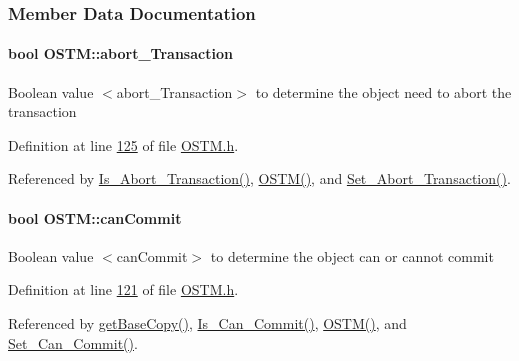 \subsubsection{Member Data Documentation}
\paragraph[{\texorpdfstring{abort\+\_\+\+Transaction}{abort_Transaction}}]{\setlength{\rightskip}{0pt plus 5cm}bool O\+S\+T\+M\+::abort\+\_\+\+Transaction\hspace{0.3cm}{\ttfamily [private]}}\hypertarget{class_o_s_t_m_a5121d9c4b08320b26beca82ba2f85c4a_a5121d9c4b08320b26beca82ba2f85c4a}{}\label{class_o_s_t_m_a5121d9c4b08320b26beca82ba2f85c4a_a5121d9c4b08320b26beca82ba2f85c4a}
Boolean value $<$abort\+\_\+\+Transaction$>$ to determine the object need to abort the transaction 

Definition at line \hyperlink{_o_s_t_m_8h_source_l00125}{125} of file \hyperlink{_o_s_t_m_8h_source}{O\+S\+T\+M.\+h}.



Referenced by \hyperlink{_o_s_t_m_8cpp_source_l00140}{Is\+\_\+\+Abort\+\_\+\+Transaction()}, \hyperlink{_o_s_t_m_8cpp_source_l00021}{O\+S\+T\+M()}, and \hyperlink{_o_s_t_m_8cpp_source_l00132}{Set\+\_\+\+Abort\+\_\+\+Transaction()}.

\paragraph[{\texorpdfstring{can\+Commit}{canCommit}}]{\setlength{\rightskip}{0pt plus 5cm}bool O\+S\+T\+M\+::can\+Commit\hspace{0.3cm}{\ttfamily [private]}}\hypertarget{class_o_s_t_m_a2a5b89641af274ddc69bdf8c1c1a07d6_a2a5b89641af274ddc69bdf8c1c1a07d6}{}\label{class_o_s_t_m_a2a5b89641af274ddc69bdf8c1c1a07d6_a2a5b89641af274ddc69bdf8c1c1a07d6}
Boolean value $<$can\+Commit$>$ to determine the object can or cannot commit 

Definition at line \hyperlink{_o_s_t_m_8h_source_l00121}{121} of file \hyperlink{_o_s_t_m_8h_source}{O\+S\+T\+M.\+h}.



Referenced by \hyperlink{_o_s_t_m_8h_source_l00051}{get\+Base\+Copy()}, \hyperlink{_o_s_t_m_8cpp_source_l00124}{Is\+\_\+\+Can\+\_\+\+Commit()}, \hyperlink{_o_s_t_m_8cpp_source_l00021}{O\+S\+T\+M()}, and \hyperlink{_o_s_t_m_8cpp_source_l00117}{Set\+\_\+\+Can\+\_\+\+Commit()}.

